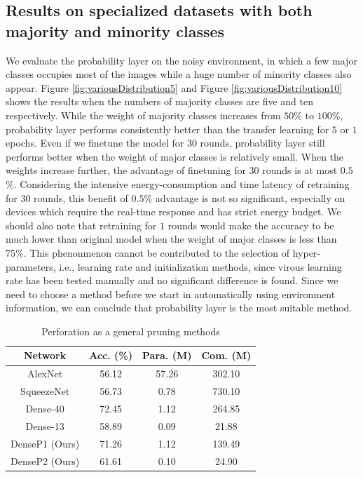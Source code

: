 \documentclass[pageno]{jpaper}
\begin{document}
\subsection{Results on specialized datasets with both majority and minority classes}
We evaluate the probability layer on the noisy environment, in which a few major classes occupies most of the images while a huge number of minority classes also appear. Figure \ref{fig:variousDistribution5} and Figure \ref{fig:variousDistribution10} shows the results when the numbers of majority classes are five and ten respectively. While the weight of majority classes increases from $50$\% to $100$\%, probability layer performs consistently better than the transfer learning for $5$ or $1$ epochs. Even if we finetune the model for $30$ rounds, probability layer still performs better when the weight of major classes is relatively small. When the weights increase further, the advantage of finetuning for $30$ rounds is at most $0.5$\%. Considering the intensive energy-consumption and time latency of retraining for $30$ rounds, this benefit of $0.5$\% advantage is not so significant, especially on devices which require the real-time response and has strict energy budget. We should also note that retraining for $1$ rounds would make the accuracy to be much lower than original model when the weight of major classes is less than 75\%. This phenonmenon cannot be contributed to the selection of hyper-parameters, i.e., learning rate and initialization methods, since virous learning rate has been tested manually and no significant difference is found. Since we need to choose a method before we start in automatically using environment information, we can conclude that probability layer is the most suitable method.




\begin{table}
    \caption{Perforation as a general pruning methods}
    \label{tab:generalPrune}

    \centering
    \begin{tabular}{ c|c|cc } 
     \hline
     Network & Acc. (\%) & Para. (M) & Com. (M) \\ 
     \hline
     AlexNet \cite{ahmed2016network, NIPS2012_4824} & 56.12 & 57.26 & 302.10 \\
     SqueezeNet \cite{iandola2016squeezenet} & 56.73 & 0.78 & 730.10 \\
     \hline
     Dense-40 \cite{huang2017densely} & 72.45 & 1.12 & 264.85 \\
     Dense-13 \cite{huang2017densely}& 58.89 & 0.09 & 21.88 \\
     \hline
     DenseP1 (Ours)& 71.26 & 1.12 & 139.49 \\
     DenseP2 (Ours)& 61.61 & 0.10 & 24.90 \\
     \hline
    \end{tabular}
\end{table}
\end{document}
